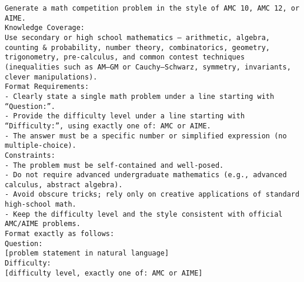 \begin{tcolorbox}[colback=gray!5!white, colframe=gray!75!black, title=Example Input -- AMC or AIME (Competition Math):]
\small
\texttt{Generate a math competition problem in the style of AMC 10, AMC 12, or AIME.} \\[4pt]

\texttt{Knowledge Coverage:} \\
\texttt{Use secondary or high school mathematics — arithmetic, algebra, counting \& probability, number theory, combinatorics, geometry, trigonometry, pre-calculus, and common contest techniques (inequalities such as AM–GM or Cauchy–Schwarz, symmetry, invariants, clever manipulations).} \\[6pt]

\texttt{Format Requirements:} \\
\texttt{- Clearly state a single math problem under a line starting with ``Question:''.} \\
\texttt{- Provide the difficulty level under a line starting with ``Difficulty:'', using exactly one of: AMC or AIME.} \\
\texttt{- The answer must be a specific number or simplified expression (no multiple-choice).} \\[6pt]

\texttt{Constraints:} \\
\texttt{- The problem must be self-contained and well-posed.} \\
\texttt{- Do not require advanced undergraduate mathematics (e.g., advanced calculus, abstract algebra).} \\
\texttt{- Avoid obscure tricks; rely only on creative applications of standard high-school math.} \\
\texttt{- Keep the difficulty level and the style consistent with official AMC/AIME problems.} \\[6pt]

\texttt{Format exactly as follows:} \\
\texttt{Question:} \\
\texttt{[problem statement in natural language]} \\
\texttt{Difficulty:} \\
\texttt{[difficulty level, exactly one of: AMC or AIME]} \\
\end{tcolorbox}



